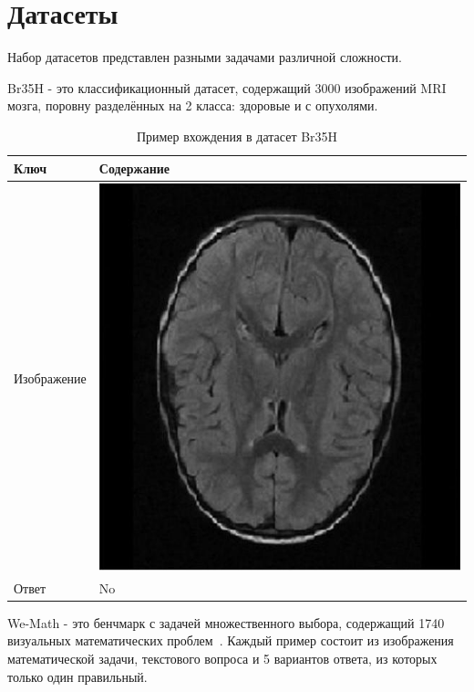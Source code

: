 \documentclass[LI,KR]{HSEUniversity}
\begin{document}
\section{Датасеты}

Набор датасетов представлен разными задачами различной сложности.

Br35H - это классификационный датасет, содержащий 3000 изображений MRI мозга, поровну разделённых на 2 класса: здоровые и с опухолями.

\begin{table}[H]
\centering
\begin{tabular}{| m{4cm} | m{10cm} |}
\hline
\textbf{Ключ} & \textbf{Содержание} \\ \hline
Изображение & \includegraphics[scale=0.15]{images/br35h_example} \\ \hline
Ответ & No \\ \hline
\end{tabular}
\caption{Пример вхождения в датасет Br35H}
\end{table}

We-Math - это бенчмарк с задачей множественного выбора, содержащий 1740 визуальных математических проблем~\cite{wemath}.
Каждый пример состоит из изображения математической задачи, текстового вопроса и 5 вариантов ответа, из которых только один правильный.
\end{document}
